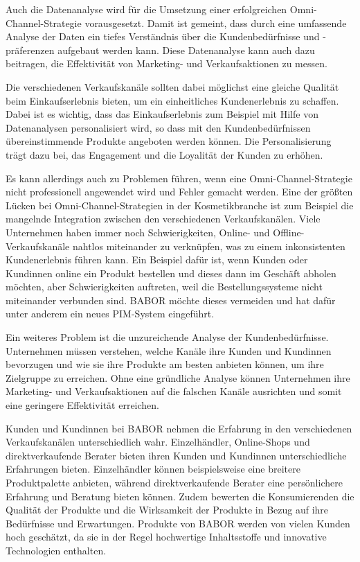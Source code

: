 Auch die Datenanalyse wird für die Umsetzung einer erfolgreichen Omni-Channel-Strategie vorausgesetzt. Damit ist gemeint, dass durch eine umfassende Analyse der Daten ein tiefes Verständnis über die Kundenbedürfnisse und -präferenzen  aufgebaut werden kann. Diese Datenanalyse kann auch dazu beitragen, die Effektivität von Marketing- und Verkaufsaktionen zu messen.
\newline

Die verschiedenen Verkaufskanäle sollten dabei möglichst eine gleiche Qualität beim Einkaufserlebnis bieten, um ein einheitliches Kundenerlebnis zu schaffen. Dabei ist es wichtig, dass das Einkaufserlebnis zum Beispiel mit Hilfe von Datenanalysen personalisiert wird, so dass mit den Kundenbedürfnissen übereinstimmende Produkte angeboten werden können. Die Personalisierung trägt dazu bei, das Engagement und die Loyalität der Kunden zu erhöhen.
\newline

Es kann allerdings auch zu Problemen führen, wenn eine Omni-Channel-Strategie nicht professionell angewendet wird und Fehler gemacht werden. Eine der größten Lücken bei Omni-Channel-Strategien in der Kosmetikbranche ist zum Beispiel die mangelnde Integration zwischen den verschiedenen Verkaufskanälen. Viele Unternehmen haben immer noch Schwierigkeiten, Online- und Offline-Verkaufskanäle nahtlos miteinander zu verknüpfen, was zu einem inkonsistenten Kundenerlebnis führen kann. Ein Beispiel dafür ist, wenn Kunden oder Kundinnen online ein Produkt bestellen und dieses dann im Geschäft abholen möchten, aber Schwierigkeiten auftreten, weil die Bestellungssysteme nicht miteinander verbunden sind. BABOR möchte dieses vermeiden und hat dafür unter anderem ein neues PIM-System eingeführt.
\newline

Ein weiteres Problem ist die unzureichende Analyse der Kundenbedürfnisse. Unternehmen müssen verstehen, welche Kanäle ihre Kunden und Kundinnen bevorzugen und wie sie ihre Produkte am besten anbieten können, um ihre Zielgruppe zu erreichen. Ohne eine gründliche Analyse können Unternehmen ihre Marketing- und Verkaufsaktionen auf die falschen Kanäle ausrichten und somit eine geringere Effektivität erreichen.
\newline

Kunden und Kundinnen bei BABOR nehmen die Erfahrung in den verschiedenen Verkaufskanälen unterschiedlich wahr. Einzelhändler, Online-Shops und direktverkaufende Berater bieten ihren Kunden und Kundinnen unterschiedliche Erfahrungen bieten. Einzelhändler können beispielsweise eine breitere Produktpalette anbieten, während direktverkaufende Berater eine persönlichere Erfahrung und Beratung bieten können.
Zudem bewerten die Konsumierenden die Qualität der Produkte und die Wirksamkeit der Produkte in Bezug auf ihre Bedürfnisse und Erwartungen. Produkte von BABOR werden von vielen Kunden hoch geschätzt, da sie in der Regel hochwertige Inhaltsstoffe und innovative Technologien enthalten.
\newline

